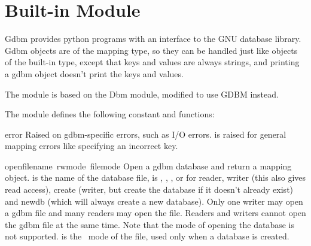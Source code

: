\section{Built-in Module }

Gdbm provides python programs with an interface to the GNU 
database library.  Gdbm objects are of the mapping type, so they can be
handled just like objects of the built-in  type,
except that keys and values are always strings, and printing a gdbm
object doesn't print the keys and values.

The module is based on the Dbm module, modified to use GDBM instead.

The module defines the following constant and functions:

\renewcommand{\indexsubitem}{(in module gdbm)}
\begin{excdesc}{error}
Raised on gdbm-specific errors, such as I/O errors.  is
raised for general mapping errors like specifying an incorrect key.
\end{excdesc}

\begin{funcdesc}{open}{filename\, rwmode\, filemode}
Open a gdbm database and return a mapping object.  is
the name of the database file,  is , ,
, or  for reader, writer (this also gives read
access), create (writer, but create the database if it doesn't already
exist) and newdb (which will always create a new database). Only one
writer may open a gdbm file and many readers may open the file. Readers
and writers cannot open the gdbm file at the same time. Note that the
 mode of opening the database is not supported.  
is the \UNIX\ mode of the file, used only when a database is created.
\end{funcdesc}
